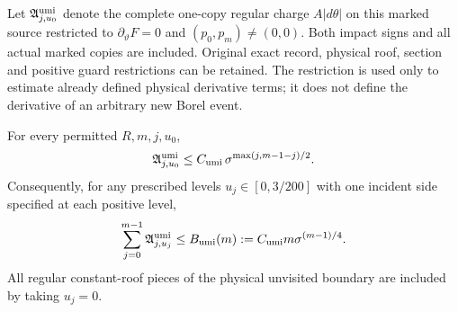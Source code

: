 Let $\mathfrak A^{\rm umi}_{j,u_0}$ denote the complete one-copy
regular charge $A|d\theta|$ on this marked source restricted to
$\partial_\vartheta F=0$ and $(p_0,p_m)\ne(0,0)$. Both impact
signs and all actual marked copies are included. Original exact
record, physical roof, section and positive guard restrictions
can be retained. The restriction is used only to estimate
already defined physical derivative terms; it does not define
the derivative of an arbitrary new Borel event.

\begin{theorem}
\label{thm:umi-charge}
For every permitted $R,m,j,u_0$,
\begin{equation}\label{eq:umi-charge}
 \mathfrak A^{\rm umi}_{j,u_0}
 \le C_{\rm umi}\,
           \sigma^{\max(j,m-1-j)/2}.
\end{equation}
Consequently, for any prescribed levels
$u_j\in[0,3/200]$ with one incident side specified at each
positive level,
\begin{equation}\label{eq:umi-all-flights}
 \sum_{j=0}^{m-1}\mathfrak A^{\rm umi}_{j,u_j}
 \le B_{\rm umi}(m):=C_{\rm umi}m\sigma^{(m-1)/4}.
\end{equation}
All regular constant-roof pieces of the physical unvisited
boundary are included by taking $u_j=0$.
\end{theorem}
